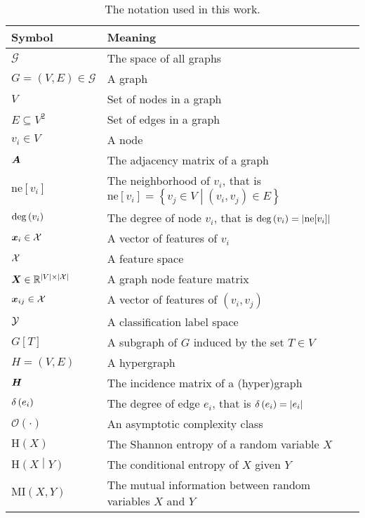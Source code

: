 \begin{table}
	\begin{ctucolortab}
		\begin{tabular}{p{0.25\linewidth}p{0.75\linewidth}}
			\toprule
			\textbf{Symbol} & \textbf{Meaning} \\
			\midrule
			\( \mathcal{G} \) & The space of all graphs \\
			\( G = \left( V, E \right) \in \mathcal{G} \) & A graph \\
			\( V \) & Set of nodes in a graph \\
			\( E \subseteq V^2 \) & Set of edges in a graph \\
			\( v_i \in V \) & A node \\
			\( \bm{A} \) & The adjacency matrix of a graph \\
			\( \mathrm{ne}[v_i] \) & The neighborhood of \( v_i \), that is \( \mathrm{ne}[v_i] = \left\{ v_j \in V \middle| \left( v_i, v_j \right) \in E \right\} \) \\
			\( \mathrm{deg} \left( v_i \right) \) & The degree of node \( v_i \), that is \( \mathrm{deg} \left( v_i \right) = \left\lvert \mathrm{ne}[v_i] \right\rvert \) \\
			\( \bm{x}_i \in \mathcal{X} \) & A vector of features of \( v_i \) \\
			\( \mathcal{X} \) & A feature space \\
			\( \bm{X} \in \mathbb{R}^{\left\lvert V \right\rvert \times \left\lvert \mathcal{X} \right\rvert} \) & A graph node feature matrix	\\
			\( \bm{x}_{ij} \in \mathcal{X} \) & A vector of features of \( \left( v_i, v_j \right) \) \\
			\( \mathcal{Y} \) & A classification label space \\
			\( G \left[ T \right] \) & A subgraph of \( G \) induced by the set \( T \in V \) \\
			\( H = \left( V, E \right) \) & A hypergraph \\
			\( \bm{H} \) & The incidence matrix of a (hyper)graph \\
			\( \delta \left( e_i \right) \) & The degree of edge \( e_i \), that is \( \delta \left( e_i \right) = \left\lvert e_i \right\rvert \) \\
			\( \mathcal{O} \left( \cdot \right) \) & An asymptotic complexity class \\
			\( \mathrm{H} \left( X \right) \) & The Shannon entropy of a random variable \( X \) \\
			\( \mathrm{H} \left( X \middle| Y \right) \) & The conditional entropy of \( X \) given \( Y \) \\
			\( \mathrm{MI} \left( X, Y \right) \) & The mutual information between random variables \( X \) and \( Y \) \\
			\bottomrule
		\end{tabular}
	\end{ctucolortab}
	\caption{The notation used in this work.}
	\label{tab:notation}
\end{table}
